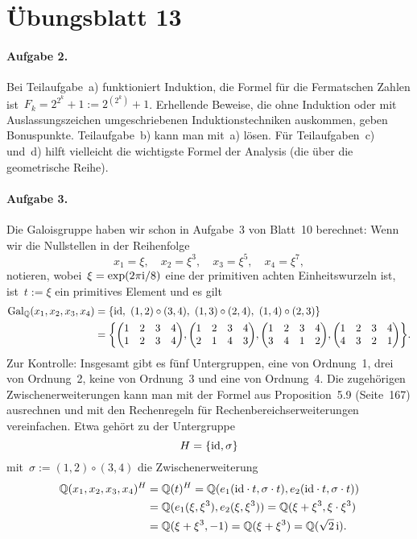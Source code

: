 \documentclass{../algblatt}
\begin{document}
\section*{Übungsblatt 13}

\paragraph{Aufgabe 2.} Bei Teilaufgabe~a) funktioniert Induktion, die Formel
für die Fermatschen Zahlen ist~$F_k = 2^{2^k} + 1 := 2^{(2^k)} + 1$.
Erhellende
Beweise, die ohne Induktion oder mit Auslassungszeichen umgeschriebenen
Induktionstechniken auskommen, geben Bonuspunkte. Teilaufgabe~b) kann man
mit~a) lösen. Für Teilaufgaben~c) und~d) hilft vielleicht die wichtigste Formel
der Analysis (die über die geometrische Reihe).

\paragraph{Aufgabe 3.} Die Galoisgruppe haben wir schon in Aufgabe~3 von
Blatt~10 berechnet: Wenn wir die Nullstellen in der Reihenfolge
\[ x_1 = \xi,\quad
  x_2 = \xi^3,\quad
  x_3 = \xi^5,\quad
  x_4 = \xi^7, \]
notieren, wobei~$\xi = \exp(2\pi\mathrm{i}/8)$ eine der primitiven achten
Einheitswurzeln ist, ist~$t := \xi$ ein primitives Element und es gilt
\begin{align*}
  \mathrm{Gal}_{\mathbb{Q}}(x_1,x_2,x_3,x_4) &=
    \left\{ \mathrm{id},\ (1,2)\circ(3,4),\ (1,3)\circ(2,4),\ (1,4)\circ(2,3) \right\} \\
  &=
    \left\{
      \begin{pmatrix}1&2&3&4\\1&2&3&4\end{pmatrix}\!,
      \begin{pmatrix}1&2&3&4\\2&1&4&3\end{pmatrix}\!,
      \begin{pmatrix}1&2&3&4\\3&4&1&2\end{pmatrix}\!,
      \begin{pmatrix}1&2&3&4\\4&3&2&1\end{pmatrix}
    \right\}\!.
\end{align*}
Zur Kontrolle: Insgesamt gibt es fünf Untergruppen, eine von Ordnung~1, drei
von Ordnung~2, keine von Ordnung~3 und eine von Ordnung~4. Die zugehörigen
Zwischenerweiterungen kann man mit der Formel aus Proposition~5.9 (Seite~167)
ausrechnen und mit den Rechenregeln für Rechenbereichserweiterungen
vereinfachen. Etwa gehört zu der Untergruppe
\[ H = \left\{ \mathrm{id}, \sigma \right\} \]
mit~$\sigma := (1,2)\circ(3,4)$ die Zwischenerweiterung
\begin{align*}
  \mathbb{Q}(x_1,x_2,x_3,x_4)^H &= \mathbb{Q}(t)^H =
  \mathbb{Q}(e_1(\mathrm{id} \cdot t, \sigma \cdot t), e_2(\mathrm{id} \cdot t, \sigma \cdot t)) \\
  &=
  \mathbb{Q}(e_1(\xi, \xi^3), e_2(\xi, \xi^3)) =
  \mathbb{Q}(\xi + \xi^3, \xi \cdot \xi^3) \\
  &=
  \mathbb{Q}(\xi + \xi^3, -1) =
  \mathbb{Q}(\xi + \xi^3) =
  \mathbb{Q}(\sqrt{2} \, \mathrm{i}).
\end{align*}
\end{document}
